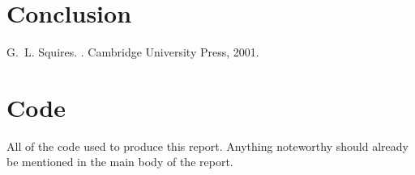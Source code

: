 \documentclass[11pt,a4paper]{article}
\begin{document}
\section{\label{sect:conclusion}Conclusion}




\begin{thebibliography}{1}

G.~L. Squires.
.
\newblock Cambridge University Press, 2001.

\end{thebibliography}

\appendix*
\section{Code}
All of the code used to produce this report. Anything noteworthy should already be mentioned in the main body of the report.



\end{document}
